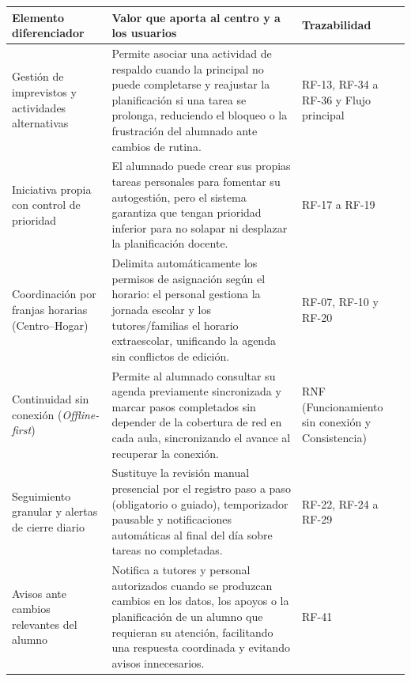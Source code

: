 \begin{center}
\small
\begin{tabularx}{\textwidth}{|>{\raggedright\arraybackslash}p{3.5cm}|>{\raggedright\arraybackslash}X|>{\raggedright\arraybackslash}p{3.2cm}|}
\hline
\rowcolor{tableHeader}
\textbf{Elemento diferenciador} & \textbf{Valor que aporta al centro y a los usuarios} & \textbf{Trazabilidad} \\
\hline
Gestión de imprevistos y actividades alternativas & Permite asociar una actividad de respaldo cuando la principal no puede completarse y reajustar la planificación si una tarea se prolonga, reduciendo el bloqueo o la frustración del alumnado ante cambios de rutina. & RF-13, RF-34 a RF-36 y Flujo principal \\
\hline
Iniciativa propia con control de prioridad & El alumnado puede crear sus propias tareas personales para fomentar su autogestión, pero el sistema garantiza que tengan prioridad inferior para no solapar ni desplazar la planificación docente. & RF-17 a RF-19 \\
\hline
Coordinación por franjas horarias (Centro--Hogar) & Delimita automáticamente los permisos de asignación según el horario: el personal gestiona la jornada escolar y los tutores/familias el horario extraescolar, unificando la agenda sin conflictos de edición. & RF-07, RF-10 y RF-20 \\
\hline
Continuidad sin conexión (\textit{Offline-first}) & Permite al alumnado consultar su agenda previamente sincronizada y marcar pasos completados sin depender de la cobertura de red en cada aula, sincronizando el avance al recuperar la conexión. & RNF (Funcionamiento sin conexión y Consistencia) \\
\hline
Seguimiento granular y alertas de cierre diario & Sustituye la revisión manual presencial por el registro paso a paso (obligatorio o guiado), temporizador pausable y notificaciones automáticas al final del día sobre tareas no completadas. & RF-22, RF-24 a RF-29 \\
\hline
Avisos ante cambios relevantes del alumno & Notifica a tutores y personal autorizados cuando se produzcan cambios en los datos, los apoyos o la planificación de un alumno que requieran su atención, facilitando una respuesta coordinada y evitando avisos innecesarios. & RF-41 \\
\hline
\end{tabularx}
\end{center}

